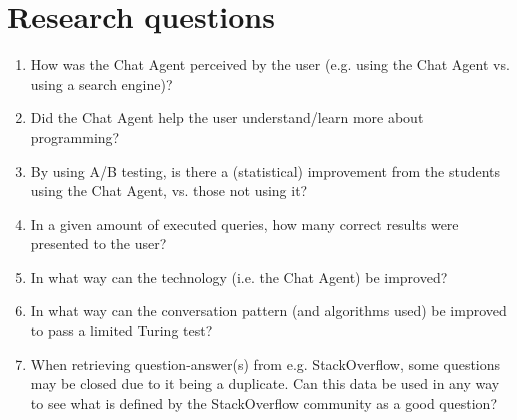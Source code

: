 \section{Research questions}
\label{chapter2:research_questions}
\begin{enumerate}
	\item \label{res_q1} How was the Chat Agent perceived by the user (e.g. using the Chat Agent vs. using a search engine)?
	\item \label{res_q2} Did the Chat Agent help the user understand/learn more about programming?
	\item \label{res_q3} By using A/B testing, is there a (statistical) improvement from the students using the Chat Agent, vs. those not using it?
	\item \label{res_q4} In a given amount of executed queries, how many correct results were presented to the user? 
	\item \label{res_q5} In what way can the technology (i.e. the Chat Agent) be improved? 
	\item \label{res_q6} In what way can the conversation pattern (and algorithms used) be improved to pass a limited Turing test?
	\item \label{res_q7} When retrieving question-answer(s) from e.g. StackOverflow, some questions may be closed due to it being a duplicate. 
	Can this data be used in any way to see what is defined by the StackOverflow community as a good question?
\end{enumerate}

